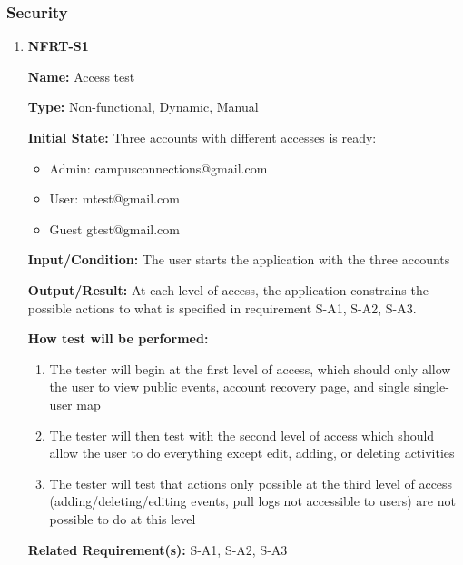 \documentclass[12pt, titlepage]{article}
\begin{document}
\subsubsection{Security}

\begin{enumerate}
\item{\textbf{NFRT-S1}}

\textbf{Name:} Access test
  
\textbf{Type:} Non-functional, Dynamic, Manual
            
\textbf{Initial State:} Three accounts with different accesses is ready:
\begin{itemize}
\item Admin: campusconnections@gmail.com
\item User: mtest@gmail.com
\item Guest gtest@gmail.com
\end{itemize}
  
\textbf{Input/Condition:} The user starts the application with the three accounts
            
\textbf{Output/Result:} At each level of access, the application constrains the possible actions to what is specified in requirement S-A1, S-A2, S-A3.
  
\textbf{How test will be performed:}
\begin{enumerate}
  \item The tester will begin at the first level of access, which should only allow the user to view public events,  account recovery page, and single single-user map
  \item The tester will then test with the second level of access which should allow the user to do everything except edit, adding, or deleting activities
  \item The tester will test that actions only possible at the third level of access (adding/deleting/editing events, pull logs not accessible to users) are not possible to do at this level
\end{enumerate}

\textbf{Related Requirement(s):} S-A1, S-A2, S-A3
\end{enumerate}
\end{document}

